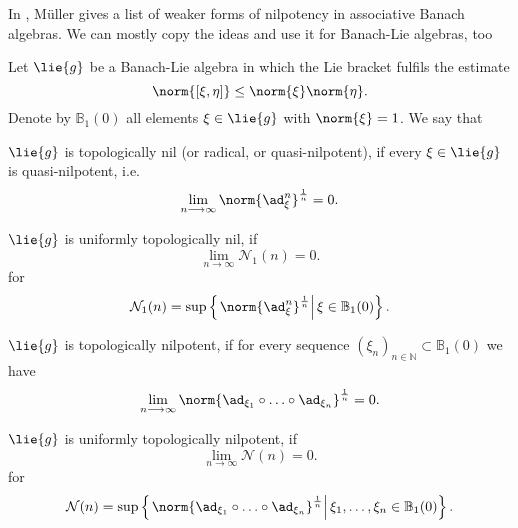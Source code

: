 In \cite{mueller:XXXXa}, M\"uller gives a list of weaker forms of nilpotency in 
associative Banach algebras. We can mostly copy the ideas and use it for 
Banach-Lie algebras, too
\begin{definition}
	Let $\lie{g}$ be a Banach-Lie algebra in which the Lie bracket fulfils the 
	estimate
	\begin{equation*}
		\norm{ [\xi, \eta] }
		\leq
		\norm{\xi}
		\norm{\eta}.
	\end{equation*}
	Denote by $\mathbb{B}_1(0)$ all elements $\xi \in \lie{g}$ with 
	$\norm{\xi} = 1$. We say that
	\begin{definitionlist}
		\item
		$\lie{g}$ is topologically nil (or radical, or quasi-nilpotent), if
		every $\xi \in \lie{g}$ is quasi-nilpotent, i.e.
		\begin{equation*}
			\lim_{n \longrightarrow \infty}
			\norm{\ad_{\xi}^n}^{\frac{1}{n}}
			=
			0.
		\end{equation*}
		
		\item
		$\lie{g}$ is uniformly topologically nil, if
		\begin{equation*}
			\lim_{n \longrightarrow \infty}
			\mathcal{N}_1(n)
			=
			0.
		\end{equation*}
		for
		\begin{equation}
			\mathcal{N}_1(n)
			=
			\sup \left\{ 
			\left.
				\norm{ \ad_{\xi}^n}^{\frac{1}{n}} 
			\right|
				\xi \in \mathbb{B}_1(0)
			\right\}.
		\end{equation}
		
		\item
		$\lie{g}$ is topologically nilpotent, if for every sequence
		$(\xi_n)_{n \in \mathbb{N}} \subset \mathbb{B}_1(0)$ we have
		\begin{equation*}
			\lim_{n \longrightarrow \infty}
			\norm{ 
				\ad_{\xi_1} \circ \ldots \circ \ad_{\xi_n}
			}^{\frac{1}{n}}
			=
			0.
		\end{equation*}
		
		\item
		$\lie{g}$ is uniformly topologically nilpotent, if
		\begin{equation*}
			\lim_{n \longrightarrow \infty}
			\mathcal{N}(n)
			=
			0.
		\end{equation*}
		for
		\begin{equation}
			\mathcal{N}(n)
			=
			\sup \left\{ 
			\left.
				\norm{ 
					\ad_{\xi_1} \circ \ldots \circ \ad_{\xi_n}
				}^{\frac{1}{n}} 
			\right|
				\xi_1, \ldots, \xi_n \in \mathbb{B}_1(0)
			\right\}.
		\end{equation}
	\end{definitionlist}
\end{definition}
